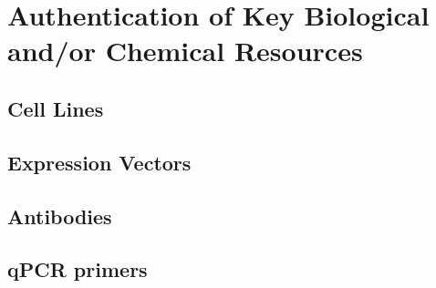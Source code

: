 

\section{Authentication of Key Biological and/or Chemical Resources}
\subsection{Cell Lines}
\lipsum[1-2]
\subsection{Expression Vectors}
\lipsum[3-3]
\subsection{Antibodies}
\lipsum[4-4]
\subsection{qPCR primers}
\lipsum[5-5]

